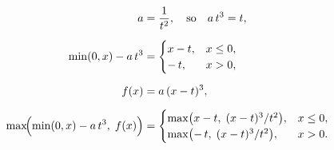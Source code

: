 \[
\begin{aligned}
a &= \frac{1}{t^2}, \quad \text{so} \quad a\,t^3 = t, \\[6pt]
\min(0, x) - a\,t^3 &=
\begin{cases}
x - t, & x \le 0,\\
-\,t, & x > 0,
\end{cases}
\\[6pt]
f(x) &= a\,(x - t)^3, \\[6pt]
\max\!\Bigl(\min(0,x) - a\,t^3,\;f(x)\Bigr) &=
\begin{cases}
\max\bigl(x - t,\;(x - t)^3 / t^2\bigr), & x \le 0,\\
\max\bigl(-\,t,\;(x - t)^3 / t^2\bigr), & x > 0.
\end{cases}
\end{aligned}
\]